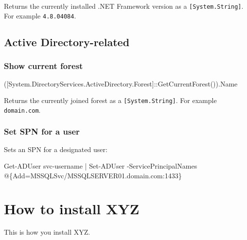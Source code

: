 \documentclass[
]{book}
\newenvironment{Shaded}{\begin{snugshade}}{\end{snugshade}}
\newcommand{\NormalTok}[1]{#1}
\begin{document}
Returns the currently installed .NET Framework version as a \texttt{{[}System.String{]}}. For example \texttt{4.8.04084}.

\hypertarget{active-directory-related}{%
\section{Active Directory-related}\label{active-directory-related}}

\hypertarget{show-current-forest}{%
\subsection{Show current forest}\label{show-current-forest}}

\begin{Shaded}
\begin{Highlighting}[]
\NormalTok{([System.DirectoryServices.ActiveDirectory.Forest]::GetCurrentForest()).Name}
\end{Highlighting}
\end{Shaded}

Returns the currently joined forest as a \texttt{{[}System.String{]}}. For example \texttt{domain.com}.

\hypertarget{set-spn-for-a-user}{%
\subsection{Set SPN for a user}\label{set-spn-for-a-user}}

Sets an SPN for a designated user:

\begin{Shaded}
\begin{Highlighting}[]
\NormalTok{Get{-}ADUser svc{-}username | Set{-}ADUser {-}ServicePrincipalNames @\{Add=\textquotesingle{}MSSQLSvc/MSSQLSERVER01.domain.com:1433\textquotesingle{}\}}
\end{Highlighting}
\end{Shaded}

\hypertarget{how-to-install-xyz}{%
\chapter{How to install XYZ}\label{how-to-install-xyz}}

This is how you install XYZ.
\end{document}
